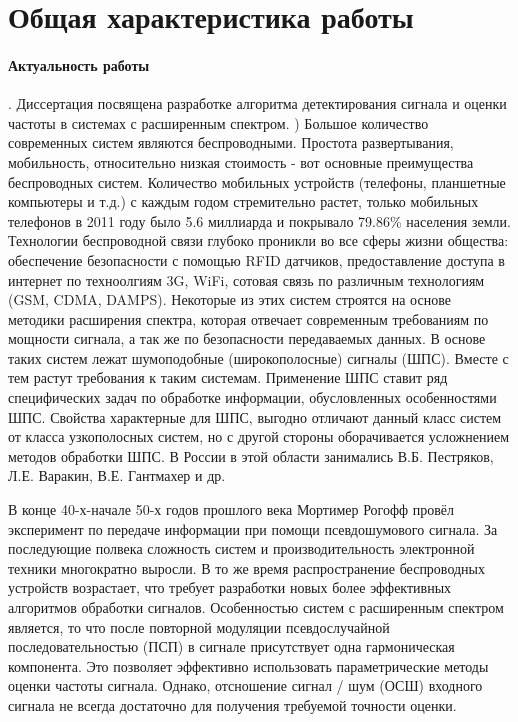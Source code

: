 \section*{Общая характеристика работы}

\paragraph{Актуальность работы}. Диссертация посвящена разработке алгоритма детектирования сигнала и оценки частоты
в системах с расширенным спектром.
)
Большое количество современных систем являются беспроводными. Простота развертывания, мобильность, относительно низкая
стоимость - вот основные преимущества беспроводных систем. Количество мобильных устройств (телефоны, планшетные компьютеры
и т.д.) с каждым годом стремительно растет, только мобильных телефонов в 2011 году было 5.6 миллиарда и покрывало 79.86\%
 населения земли. Технологии беспроводной связи глубоко проникли во все сферы жизни общества:
обеспечение безопасности с помощью RFID датчиков, предоставление доступа в интернет по техноолгиям 3G, WiFi, 
сотовая связь по различным технологиям (GSM, CDMA, DAMPS). Некоторые из этих систем строятся на основе методики
расширения спектра, которая отвечает современным требованиям по мощности сигнала, а так же по безопасности передаваемых
данных. В основе таких систем лежат шумоподобные (широкополосные) сигналы (ШПС). Вместе с тем растут требования к таким
системам. Применение ШПС ставит ряд специфических задач по обработке информации, обусловленных особенностями ШПС.
Свойства характерные для ШПС, выгодно отличают данный класс систем от класса узкополосных систем, но с другой стороны
оборачивается усложнением методов обработки ШПС. В России в этой области занимались В.Б. Пестряков, Л.Е. Варакин, В.Е. Гантмахер и др.

В конце 40-х-начале 50-х годов прошлого века Мортимер Рогофф провёл эксперимент по передаче информации при помощи
псевдошумового сигнала. За последующие полвека сложность систем и производительность электронной техники многократно
выросли. В то же время распространение беспроводных устройств возрастает, что требует разработки новых более
эффективных алгоритмов обработки сигналов. Особенностью систем с расширенным спектром является, то что после повторной
модуляции псевдослучайной последовательностью (ПСП) в сигнале присутствует одна гармоническая компонента.
Это позволяет эффективно использовать параметрические методы
оценки частоты сигнала. Однако, отсношение сигнал / шум (ОСШ) входного сигнала не всегда достаточно для получения требуемой точности оценки.

